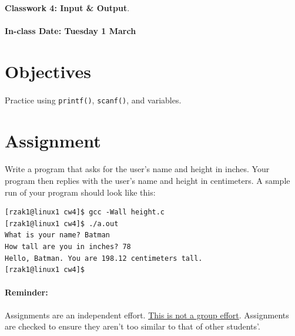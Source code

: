 \documentclass[letter,11pt]{article}
\begin{document}
\huge
\textbf{Classwork 4: Input \& Output}.
\normalsize
\\ ~~ \\
\textbf{In-class Date: Tuesday 1 March}

\section*{Objectives}
\paragraph{}Practice using \texttt{printf()}, \texttt{scanf()}, and variables.

\section*{Assignment}
\paragraph{}Write a program that asks for the user's name and height in inches. Your program then replies with the user's name and height in centimeters. A sample run of your program should look like this:
\begin{verbatim}
[rzak1@linux1 cw4]$ gcc -Wall height.c 
[rzak1@linux1 cw4]$ ./a.out
What is your name? Batman
How tall are you in inches? 78
Hello, Batman. You are 198.12 centimeters tall.
[rzak1@linux1 cw4]$ 
\end{verbatim}

\paragraph{Reminder:} Assignments are an independent effort. \underline{This is not a group effort}. Assignments are checked to ensure they aren't too similar to that of other students'.
\end{document}
